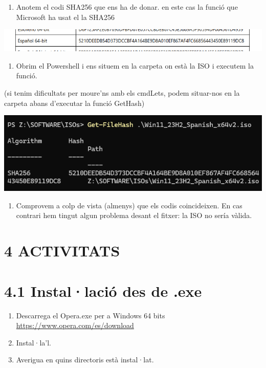 \documentclass[
  a4paper,
]{article}
\providecommand{\tightlist}{%
  \setlength{\itemsep}{0pt}\setlength{\parskip}{0pt}}
\begin{document}
\begin{enumerate}
\def\labelenumi{\arabic{enumi}.}
\setcounter{enumi}{1}
\tightlist
\item
  Anotem el codi SHA256 que ens ha de donar. en este cas la funció que
  Microsoft ha usat el la SHA256
\end{enumerate}

\includegraphics{png/comprobarSHA2.png}

\begin{enumerate}
\def\labelenumi{\arabic{enumi}.}
\setcounter{enumi}{2}
\tightlist
\item
  Obrim el Powershell i ens situem en la carpeta on està la ISO i
  executem la funció.
\end{enumerate}

(si tenim dificultats per moure'ns amb els cmdLets, podem situar-nos en
la carpeta abans d'executar la funció GetHash)

\includegraphics{png/getHash1.png}

\begin{enumerate}
\def\labelenumi{\arabic{enumi}.}
\setcounter{enumi}{3}
\tightlist
\item
  Comprovem a colp de vista (almenys) que els codis coincideixen. En cas
  contrari hem tingut algun problema desant el fitxer: la ISO no sería
  vàlida.
\end{enumerate}

\section{4 ACTIVITATS}\label{activitats}

\section{4.1 Instal·lació des de .exe}\label{installaciuxf3-des-de-.exe}

\begin{enumerate}
\def\labelenumi{\arabic{enumi}.}
\item
  Descarrega el Opera.exe per a Windows 64 bits
  \url{https://www.opera.com/es/download}
\item
  Instal·la'l.
\item
  Averigua en quins directoris està instal·lat.
\end{enumerate}
\end{document}
